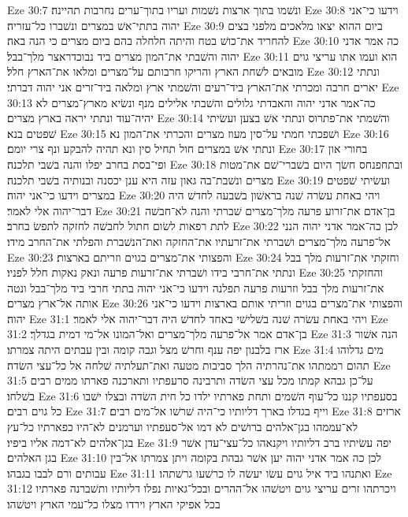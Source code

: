 Eze 30:7  ונשׁמו בתוך ארצות נשׁמות ועריו בתוך־ערים נחרבות תהיינה׃
Eze 30:8  וידעו כי־אני יהוה בתתי־אשׁ במצרים ונשׁברו כל־עזריה׃
Eze 30:9  ביום ההוא יצאו מלאכים מלפני בצים להחריד את־כושׁ בטח והיתה חלחלה בהם ביום מצרים כי הנה באה׃
Eze 30:10  כה אמר אדני יהוה והשׁבתי את־המון מצרים ביד נבוכדראצר מלך־בבל׃
Eze 30:11  הוא ועמו אתו עריצי גוים מובאים לשׁחת הארץ והריקו חרבותם על־מצרים ומלאו את־הארץ חלל׃
Eze 30:12  ונתתי יארים חרבה ומכרתי את־הארץ ביד־רעים והשׁמתי ארץ ומלאה ביד־זרים אני יהוה דברתי׃
Eze 30:13  כה־אמר אדני יהוה והאבדתי גלולים והשׁבתי אלילים מנף ונשׂיא מארץ־מצרים לא יהיה־עוד ונתתי יראה בארץ מצרים׃
Eze 30:14  והשׁמתי את־פתרוס ונתתי אשׁ בצען ועשׂיתי שׁפטים בנא׃
Eze 30:15  ושׁפכתי חמתי על־סין מעוז מצרים והכרתי את־המון נא׃
Eze 30:16  ונתתי אשׁ במצרים חול תחיל סין ונא תהיה להבקע ונף צרי יומם׃
Eze 30:17  בחורי און ופי־בסת בחרב יפלו והנה בשׁבי תלכנה׃
Eze 30:18  ובתחפנחס חשׂך היום בשׁברי־שׁם את־מטות מצרים ונשׁבת־בה גאון עזה היא ענן יכסנה ובנותיה בשׁבי תלכנה׃
Eze 30:19  ועשׂיתי שׁפטים במצרים וידעו כי־אני יהוה׃
Eze 30:20  ויהי באחת עשׂרה שׁנה בראשׁון בשׁבעה לחדשׁ היה דבר־יהוה אלי לאמר׃
Eze 30:21  בן־אדם את־זרוע פרעה מלך־מצרים שׁברתי והנה לא־חבשׁה לתת רפאות לשׂום חתול לחבשׁה לחזקה לתפשׂ בחרב׃
Eze 30:22  לכן כה־אמר אדני יהוה הנני אל־פרעה מלך־מצרים ושׁברתי את־זרעתיו את־החזקה ואת־הנשׁברת והפלתי את־החרב מידו׃
Eze 30:23  והפצותי את־מצרים בגוים וזריתם בארצות׃
Eze 30:24  וחזקתי את־זרעות מלך בבל ונתתי את־חרבי בידו ושׁברתי את־זרעות פרעה ונאק נאקות חלל לפניו׃
Eze 30:25  והחזקתי את־זרעות מלך בבל וזרעות פרעה תפלנה וידעו כי־אני יהוה בתתי חרבי ביד מלך־בבל ונטה אותה אל־ארץ מצרים׃
Eze 30:26  והפצותי את־מצרים בגוים וזריתי אותם בארצות וידעו כי־אני יהוה׃
Eze 31:1  ויהי באחת עשׂרה שׁנה בשׁלישׁי באחד לחדשׁ היה דבר־יהוה אלי לאמר׃
Eze 31:2  בן־אדם אמר אל־פרעה מלך־מצרים ואל־המונו אל־מי דמית בגדלך׃
Eze 31:3  הנה אשׁור ארז בלבנון יפה ענף וחרשׁ מצל וגבה קומה ובין עבתים היתה צמרתו׃
Eze 31:4  מים גדלוהו תהום רממתהו את־נהרתיה הלך סביבות מטעה ואת־תעלתיה שׁלחה אל כל־עצי השׂדה׃
Eze 31:5  על־כן גבהא קמתו מכל עצי השׂדה ותרבינה סרעפתיו ותארכנה פארתו ממים רבים בשׁלחו׃
Eze 31:6  בסעפתיו קננו כל־עוף השׁמים ותחת פארתיו ילדו כל חית השׂדה ובצלו ישׁבו כל גוים רבים׃
Eze 31:7  וייף בגדלו בארך דליותיו כי־היה שׁרשׁו אל־מים רבים׃
Eze 31:8  ארזים לא־עממהו בגן־אלהים ברושׁים לא דמו אל־סעפתיו וערמנים לא־היו כפארתיו כל־עץ בגן־אלהים לא־דמה אליו ביפיו׃
Eze 31:9  יפה עשׂיתיו ברב דליותיו ויקנאהו כל־עצי־עדן אשׁר בגן האלהים׃
Eze 31:10  לכן כה אמר אדני יהוה יען אשׁר גבהת בקומה ויתן צמרתו אל־בין עבותים ורם לבבו בגבהו׃
Eze 31:11  ואתנהו ביד איל גוים עשׂו יעשׂה לו כרשׁעו גרשׁתהו׃
Eze 31:12  ויכרתהו זרים עריצי גוים ויטשׁהו אל־ההרים ובכל־גאיות נפלו דליותיו ותשׁברנה פארתיו בכל אפיקי הארץ וירדו מצלו כל־עמי הארץ ויטשׁהו׃
